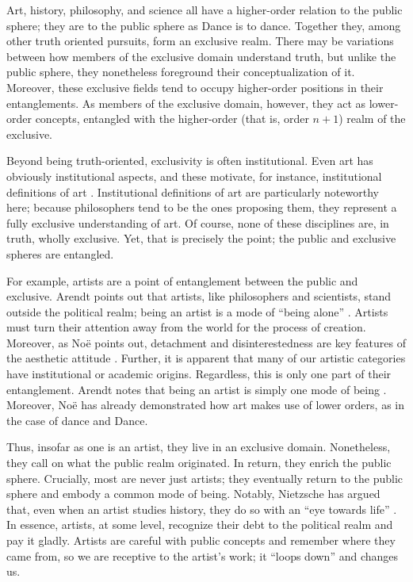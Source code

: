 \documentclass[12pt,letterpaper]{article}
\begin{document}
Art, history, philosophy, and science all have a higher-order relation to the
public sphere; they are to the public sphere as Dance is to dance. Together
they, among other truth oriented pursuits, form an exclusive realm. There may be
variations between how members of the exclusive domain understand truth, but
unlike the public sphere, they nonetheless foreground their conceptualization of
it. Moreover, these exclusive fields tend to occupy higher-order positions in
their entanglements. As members of the exclusive domain, however, they act as
lower-order concepts, entangled with the higher-order (that is, order $n+1$)
realm of the exclusive.

Beyond being truth-oriented, exclusivity is often institutional. Even art has
obviously institutional aspects, and these motivate, for instance, institutional
definitions of art \autocite[8]{winnerHow2019}. Institutional definitions of art
are particularly noteworthy here; because philosophers tend to be the ones
proposing them, they represent a fully exclusive understanding of art. Of
course, none of these disciplines are, in truth, wholly exclusive. Yet, that is
precisely the point; the public and exclusive spheres are entangled.

For example, artists are a point of entanglement between the public and
exclusive. Arendt points out that artists, like philosophers and scientists,
stand outside the political realm; being an artist is a mode of ``being alone''
\autocite[259--260]{arendtFuture1968}. Artists must turn their attention away
from the world for the process of creation. Moreover, as Noë points out,
detachment and disinterestedness are key features of the aesthetic attitude
\autocite[188--189]{noeEntanglement2023}. Further, it is apparent that many of
our artistic categories have institutional or academic origins. Regardless, this
is only one part of their entanglement. Arendt notes that being an artist is
simply one mode of being \autocite[259--260]{arendtFuture1968}. Moreover, Noë
has already demonstrated how art makes use of lower orders, as in the case of
dance and Dance.

Thus, insofar as one is an artist, they live in an exclusive domain.
Nonetheless, they call on what the public realm originated. In return, they
enrich the public sphere. Crucially, most are never just artists; they
eventually return to the public sphere and embody a common mode of being.
Notably, Nietzsche has argued that, even when an artist studies history, they do
so with an ``eye towards life'' \autocite[100--101]{nietzscheUnfashionable1995}.
In essence, artists, at some level, recognize their debt to the political realm
and pay it gladly. Artists are careful with public concepts and remember where
they came from, so we are receptive to the artist's work; it ``loops down'' and
changes us.
\end{document}
